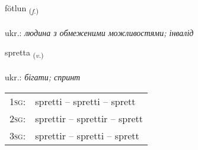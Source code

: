 \documentclass[frontgrid, backgrid]{flacards}\usepackage[]{graphicx}\usepackage[]{xcolor}
\begin{document}
\renewcommand{\flhead}{\vskip5pt \fboxsep=0pt {\small\bfseries\footnotesize Nafnorð | іменник}}
\renewcommand{\fcfoot}{\vskip5pt \fboxsep=0pt \hspace{2pt}{\small\bfseries\footnotesize 3K}}

\renewcommand{\blhead}{\vskip5pt {\small\bfseries\footnotesize Nafnorð | іменник }}
\renewcommand{\bcfoot}{\vskip5pt \hspace{2pt}{\small\bfseries\footnotesize 3K}}


{fötlun \small{\textsubscript{(\textit{f.})}} \\[1ex] %
\textphonetic{[fœhtlʏn]} \\
ukr.: \emph{людина з обмеженими можливостями; інвалід} \\  [2ex]
\renewcommand*{\arraystretch}{0.8}
}

\renewcommand{\flhead}{\vskip5pt \fboxsep=0pt {\small\bfseries\footnotesize Sagnorð | дієслово}}
\renewcommand{\fcfoot}{\vskip5pt \fboxsep=0pt \hspace{2pt}{\small\bfseries\footnotesize 3K}}

\renewcommand{\blhead}{\vskip5pt {\small\bfseries\footnotesize Sagnorð | дієслово }}
\renewcommand{\bcfoot}{\vskip5pt \hspace{2pt}{\small\bfseries\footnotesize 3K}}


{spretta \small{\textsubscript{(\textit{v.})}} \\[1ex] %
\textphonetic{[sprɛhta]} \\
ukr.: \emph{бігати; спринт} \\  [2ex]
\renewcommand*{\arraystretch}{0.8}
\begin{tabular}{p{1cm}l}
\textsc{1sg}: & spretti -- spretti -- sprett \\ 
\textsc{2sg}: & sprettir -- sprettir -- sprett \\ 
\textsc{3sg}: & sprettir -- spretti -- sprett \\ 
\end{tabular}
}
\end{document}
